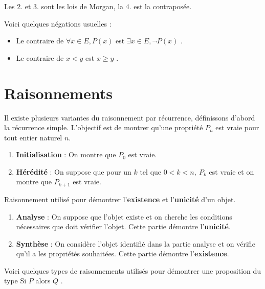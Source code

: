 \begin{remark}
    Les 2. et 3. sont les lois de Morgan, la 4. est la contraposée.
\end{remark}

\par \noindent Voici quelques négations usuelles :
\begin{itemize}
    \item Le contraire de \og $\forall x \in E, P(x)$ \fg est \og $\exists x \in E, \neg P(x)$ \fg.
    \item Le contraire de \og $x < y$ \fg est \og $x \geq y$ \fg.
\end{itemize}

\section{Raisonnements}

\begin{definition}
    Il existe plusieurs variantes du raisonnement par récurrence, définissons d'abord la récurrence simple. L'objectif est de montrer qu'une propriété $P_n$ est vraie pour tout entier naturel $n$. 
    \begin{enumerate}
        \item \textbf{Initialisation} : On montre que $P_0$ est vraie.
        \item \textbf{Hérédité} : On suppose que pour un $k$ tel que $0 < k < n,\ P_k$ est vraie et on montre que $P_{k+1}$ est vraie.
    \end{enumerate}
\end{definition}

\begin{definition}
	Raisonnement utilisé pour démontrer l'\textbf{existence} et l'\textbf{unicité} d'un objet.
	\begin{enumerate}
		\item \textbf{Analyse} : On suppose que l'objet existe et on cherche les conditions nécessaires que doit vérifier l'objet. Cette partie démontre l'\textbf{unicité}.
		\item \textbf{Synthèse} : On considère l'objet identifié dans la partie analyse et on vérifie qu'il a les propriétés souhaitées. Cette partie démontre l'\textbf{existence}.
	\end{enumerate}
\end{definition}

Voici quelques types de raisonnements utilisés pour démontrer une proposition du type \og Si $P$ alors $Q$ \fg.

